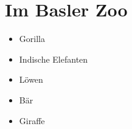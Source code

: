 \section{Im Basler Zoo}

\begin{itemize}
 
\item Gorilla
 
\item Indische Elefanten
 
\item Löwen

\item Bär

\item Giraffe

\end{itemize}
   


